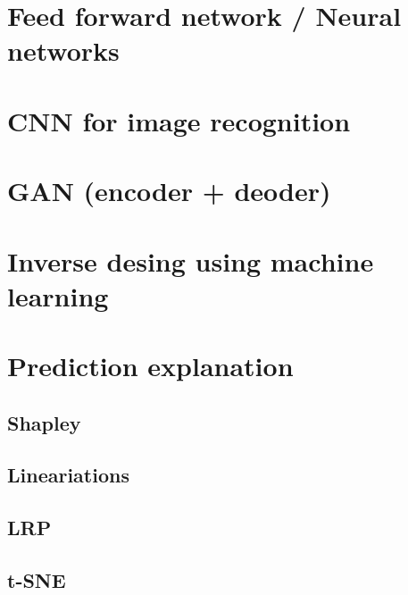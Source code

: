 \section{Feed forward network / Neural networks}
\section{CNN for image recognition}
\section{GAN (encoder + deoder)}
\section{Inverse desing using machine learning}
\section{Prediction explanation}
\subsection{Shapley}
\subsection{Lineariations}
\subsection{LRP}
\subsection{t-SNE}




